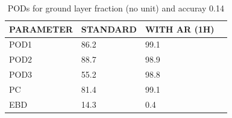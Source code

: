 \begin{table}[]
\begin{center}
\begin{tabular}{|l|l|l|l|}
\hline
\multicolumn{1}{|c|}{\cellcolor[HTML]{C0C0C0}\textbf{PARAMETER}} & \multicolumn{1}{c|}{\cellcolor[HTML]{C0C0C0}\textbf{STANDARD}} & \multicolumn{1}{c|}{\cellcolor[HTML]{C0C0C0}\textbf{WITH AR (1H)}} \\
\hline
\cellcolor[HTML]{C0C0C0}POD1  & 86.2                                & 99.1         \\
\cellcolor[HTML]{C0C0C0}POD2  & 88.7                                & 98.9         \\
\cellcolor[HTML]{C0C0C0}POD3  & 55.2                                & 98.8         \\
\cellcolor[HTML]{C0C0C0}PC    & 81.4                                  & 99.1           \\
\cellcolor[HTML]{C0C0C0}EBD   & 14.3                                 & 0.4          \\
\hline
\end{tabular}
\caption{PODs for ground layer fraction (no unit) and accuray 0.14}
\end{center}
\end{table}
